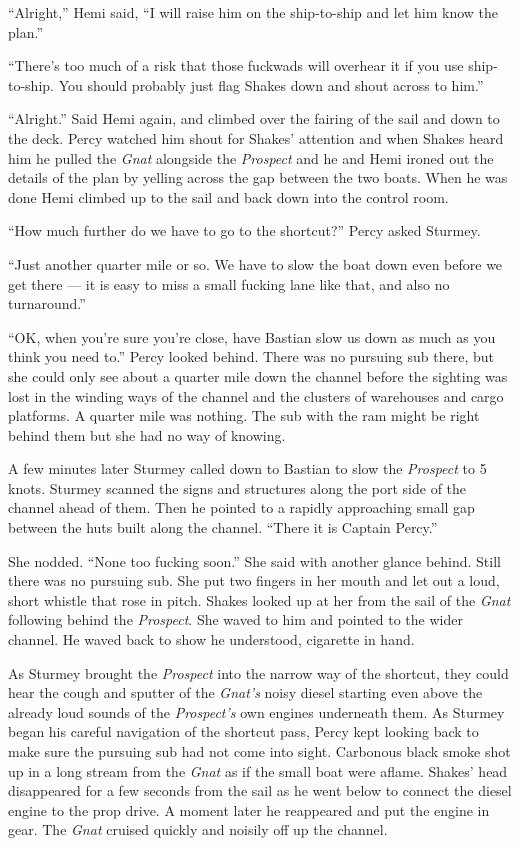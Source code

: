 \documentclass[
]{scrbook}
\begin{document}
``Alright,'' Hemi said, ``I will raise him on the ship-to-ship and let
him know the plan.''

``There's too much of a risk that those fuckwads will overhear it if you
use ship-to-ship. You should probably just flag Shakes down and shout
across to him.''

``Alright.'' Said Hemi again, and climbed over the fairing of the sail
and down to the deck. Percy watched him shout for Shakes' attention and
when Shakes heard him he pulled the \emph{Gnat} alongside the
\emph{Prospect} and he and Hemi ironed out the details of the plan by
yelling across the gap between the two boats. When he was done Hemi
climbed up to the sail and back down into the control room.

``How much further do we have to go to the shortcut?'' Percy asked
Sturmey.

``Just another quarter mile or so. We have to slow the boat down even
before we get there --- it is easy to miss a small fucking lane like
that, and also no turnaround.''

``OK, when you're sure you're close, have Bastian slow us down as much
as you think you need to.'' Percy looked behind. There was no pursuing
sub there, but she could only see about a quarter mile down the channel
before the sighting was lost in the winding ways of the channel and the
clusters of warehouses and cargo platforms. A quarter mile was nothing.
The sub with the ram might be right behind them but she had no way of
knowing.

A few minutes later Sturmey called down to Bastian to slow the
\emph{Prospect} to 5 knots. Sturmey scanned the signs and structures
along the port side of the channel ahead of them. Then he pointed to a
rapidly approaching small gap between the huts built along the channel.
``There it is Captain Percy.''

She nodded. ``None too fucking soon.'' She said with another glance
behind. Still there was no pursuing sub. She put two fingers in her
mouth and let out a loud, short whistle that rose in pitch. Shakes
looked up at her from the sail of the \emph{Gnat} following behind the
\emph{Prospect}. She waved to him and pointed to the wider channel. He
waved back to show he understood, cigarette in hand.

As Sturmey brought the \emph{Prospect} into the narrow way of the
shortcut, they could hear the cough and sputter of the \emph{Gnat's}
noisy diesel starting even above the already loud sounds of the
\emph{Prospect's} own engines underneath them. As Sturmey began his
careful navigation of the shortcut pass, Percy kept looking back to make
sure the pursuing sub had not come into sight. Carbonous black smoke
shot up in a long stream from the \emph{Gnat} as if the small boat were
aflame. Shakes' head disappeared for a few seconds from the sail as he
went below to connect the diesel engine to the prop drive. A moment
later he reappeared and put the engine in gear. The \emph{Gnat} cruised
quickly and noisily off up the channel.
\end{document}
